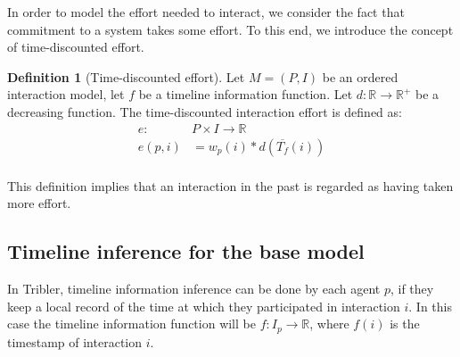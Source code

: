 \documentclass[a4paper,11pt]{book}
\newcommand{\bb}{\mathbb}
\newcommand{\ov}{\overline}
\theoremstyle{definition}
\newtheorem{definition}{Definition}
\begin{document}
In order to model the effort needed to interact, we consider the fact that commitment to
a system takes some effort. To this end, we introduce the concept of time-discounted effort.

\begin{definition}[Time-discounted effort]
    Let $M = (P, I)$ be an ordered interaction model, let $f$ be a timeline information function.
    Let $d: \bb{R} \to \bb{R}^+$ be a decreasing function. The time-discounted interaction
    effort is defined as:
    \begin{align*}
        e: & P \times I \to \bb{R} \\
        e(p, i) &= w_p(i)*d(\ov{T_f}(i)) \\
    \end{align*}
\end{definition}

This definition implies that an interaction in the past is regarded as having taken more effort.

\subsection{Timeline inference for the base model}


In Tribler, timeline information inference can be done by each agent $p$, if they
keep a local record of the time at which they participated in interaction $i$. In this
case the timeline information function will be $f : I_p \to \bb{R}$, where $f(i)$ is
the timestamp of interaction $i$.





{}

\end{document}
